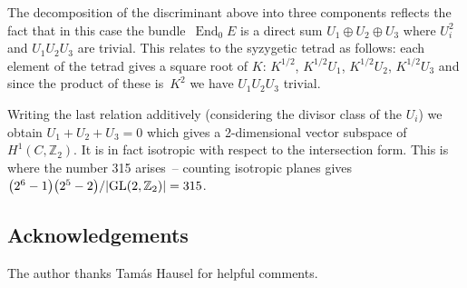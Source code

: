 \documentclass[10pt,a4paper]{amsart}
\numberwithin{equation}{section}
\begin{document}
 The decomposition of the discriminant above into three components reflects the fact that in this case the bundle~$\operatorname{End}_0E$ is a direct sum $U_1\oplus U_2\oplus U_3$ where $U_i^2$ and $U_1U_2 U_3$ are trivial. This relates to the syzygetic tetrad as follows: each element of the tetrad gives a square root of $K$: $K^{1/2}$, $K^{1/2}U_1$, $K^{1/2}U_2$, $K^{1/2}U_3$ and since the product of these is~$K^2$ we have $U_1U_2U_3$ trivial.

 Writing the last relation additively (considering the divisor class of the $U_i$) we obtain $U_1+U_2+U_3=0$ which gives a 2-dimensional vector subspace of $H^1(C,{\mathbb Z}_2)$. It is in fact isotropic with respect to the intersection form. This is where
 the number 315 arises~-- counting isotropic planes gives $\big(2^6-1\big)\big(2^5-2\big)/\vert {\rm GL}(2,{\mathbb Z}_2)\vert=315$.

\subsection*{Acknowledgements}
The author thanks Tam\'as Hausel for helpful comments.

\end{document}
